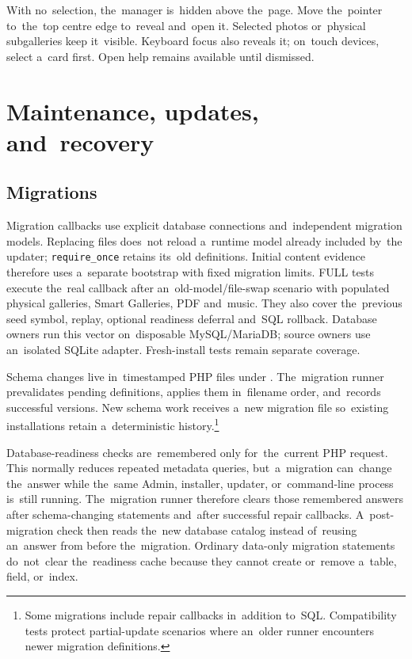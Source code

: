 \documentclass[11pt,a4paper]{article}
\newcommand{\filepath}[1]{\path{#1}}
\newcommand{\codeword}[1]{\nolinkurl{#1}}
\begin{document}
With no~selection, the~manager is~hidden above the~page. Move the~pointer
to~the~top centre edge to~reveal and~open it. Selected photos or~physical
subgalleries keep it~visible. Keyboard focus also reveals it; on~touch devices,
select a~card first. Open help remains available until dismissed.

\section{Maintenance, updates, and~recovery}
\label{sec:maintenance}

\subsection{Migrations}

Migration callbacks use explicit database connections and~independent migration
models. Replacing files does~not reload a~runtime model already included by~the
updater; \codeword{require\_once} retains its~old definitions. Initial content
evidence therefore uses a~separate bootstrap with fixed migration limits.
FULL tests execute the~real callback after an~old-model/file-swap scenario with
populated physical galleries, Smart Galleries, PDF and~music. They also cover
the~previous seed symbol, replay, optional readiness deferral and~SQL rollback.
Database owners run this vector on~disposable MySQL/MariaDB; source owners use
an~isolated SQLite adapter. Fresh-install tests remain separate coverage.

Schema changes live in~timestamped PHP files under
\filepath{database/migrations/}. The~migration runner prevalidates pending
definitions, applies them in~filename order, and~records successful versions.
New schema work receives a~new migration file so~existing installations retain
a~deterministic history.\footnote{Some migrations include repair callbacks
in~addition to~SQL. Compatibility tests protect partial-update scenarios where
an~older runner encounters newer migration definitions.}

Database-readiness checks are~remembered only for~the~current PHP request. This
normally reduces repeated metadata queries, but~a~migration can~change
the~answer while the~same Admin, installer, updater, or~command-line process
is~still running. The~migration runner therefore clears those remembered answers
after schema-changing statements and~after successful repair callbacks.
A~post-migration check then reads the~new database catalog instead of~reusing
an~answer from before the~migration. Ordinary data-only migration statements
do~not~clear the~readiness cache because they cannot create or~remove a~table,
field, or~index.
\end{document}
